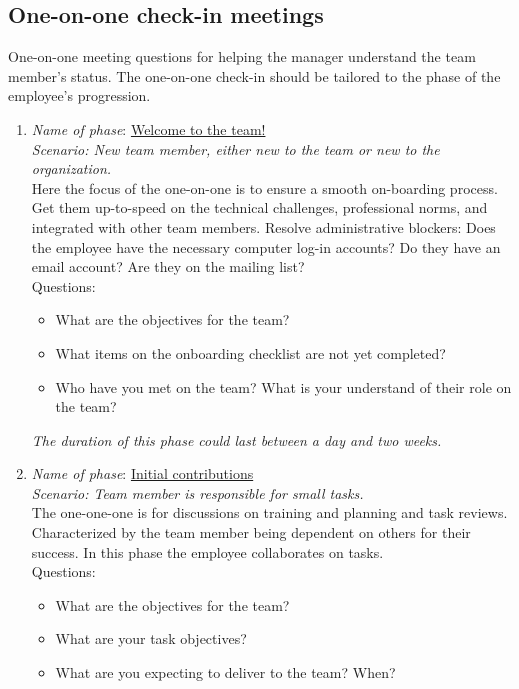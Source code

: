 \subsection{One-on-one check-in meetings}


One-on-one meeting questions for helping the manager understand the team member's status. 
The one-on-one check-in should be tailored to the phase of the employee's progression. 
\begin{enumerate}
    \item \textit{Name of phase}: \underline{Welcome to the team!}\\
    \textit{Scenario: New team member, either new to the team or new to the organization. }\\
    Here the focus of the one-on-one is to ensure a smooth on-boarding process. Get them up-to-speed on the technical challenges, professional norms, and integrated with other team members. Resolve administrative blockers: Does the employee have the necessary computer log-in accounts? Do they have an email account? Are they on the mailing list? \\
    Questions:
    \begin{itemize}
        \item What are the objectives for the team?
        \item What items on the onboarding checklist are not yet completed?
        \item Who have you met on the team? What is your understand of their role on the team?
    \end{itemize}
\textit{The duration of this phase could last between a day and two weeks.}
    \item \textit{Name of phase}: \underline{Initial contributions}\\
    \textit{Scenario: Team member is responsible for small tasks. }\\
    The one-one-one is for discussions on training and planning and task reviews. Characterized by the team member being dependent on others for their success. In this phase the employee collaborates on tasks.\\
    Questions:
    \begin{itemize}
        \item What are the objectives for the team?
        \item What are your task objectives?
        \item What are you expecting to deliver to the team? When? 

\end{itemize}
\end{enumerate}
